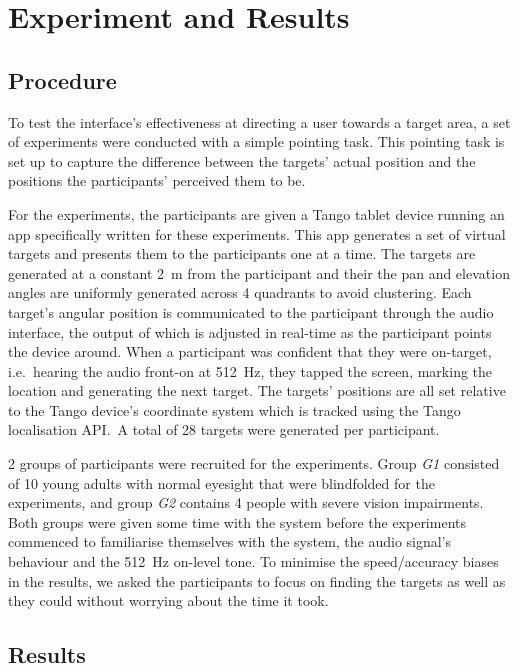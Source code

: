 \documentclass{llncs}
\begin{document}
\section{Experiment and Results}\label{sec:experiment-and-results}

\subsection{Procedure}

To test the interface's effectiveness at directing a user towards a target area, a set of experiments were conducted with a simple pointing task. 
This pointing task is set up to capture the difference between the targets' actual position and the positions the participants' perceived them to be.

For the experiments, the participants are given a Tango tablet device running an app specifically written for these experiments. 
This app generates a set of virtual targets and presents them to the participants one at a time. 
The targets are generated at a constant \SI{2}{\meter} from the participant and their the pan and elevation angles are uniformly generated across 4 quadrants to avoid clustering.
Each target's angular position is communicated to the participant through the audio interface, the output of which is adjusted in real-time as the participant points the device around. 
When a participant was confident that they were on-target, i.e.\ hearing the audio front-on at \SI{512}{\hertz}, they tapped the screen, marking the location and generating the next target.
The targets' positions are all set relative to the Tango device's coordinate system which is tracked using the Tango localisation API.\
A total of 28 targets were generated per participant. 

2 groups of participants were recruited for the experiments. 
Group \textit{G1} consisted of 10 young adults with normal eyesight that were blindfolded for the experiments, and group \textit{G2} contains 4 people with severe vision impairments. 
Both groups were given some time with the system before the experiments commenced to familiarise themselves with the system, the audio signal's behaviour and the \SI{512}{\hertz} on-level tone. 
To minimise the speed/accuracy biases in the results, we asked the participants to focus on finding the targets as well as they could without worrying about the time it took.  

\subsection{Results}
\end{document}
